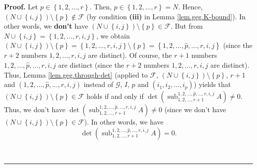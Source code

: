 \documentclass[numbers=enddot,12pt,final,onecolumn,notitlepage]{scrartcl}%
\theoremstyle{definition}
\newenvironment{proof}[1][Proof]{\noindent\textbf{#1.} }{\ \rule{0.5em}{0.5em}}
\theoremstyle{plainsl}
\begin{document}
\begin{proof}
Let $p\in\left\{  1,2,\ldots,r\right\}  $. Then, $p\in\left\{  1,2,\ldots
,r\right\}  =N$. Hence, $\left(  N\cup\left\{  i,j\right\}  \right)
\setminus\left\{  p\right\}  \notin\mathcal{F}$ (by condition \textbf{(iii)}
in Lemma \ref{lem.geg.K-bound}). In other words, we \textbf{don't} have
$\left(  N\cup\left\{  i,j\right\}  \right)  \setminus\left\{  p\right\}
\in\mathcal{F}$. But from $N\cup\left\{  i,j\right\}  =\left\{  1,2,\ldots
,r,i,j\right\}  $, we obtain $\left(  N\cup\left\{  i,j\right\}  \right)
\setminus\left\{  p\right\}  =\left\{  1,2,\ldots,r,i,j\right\}
\setminus\left\{  p\right\}  =\left\{  1,2,\ldots,\widehat{p},\ldots
,r,i,j\right\}  $ (since the $r+2$ numbers $1,2,\ldots,r,i,j$ are distinct).
Of course, the $r+1$ numbers $1,2,\ldots,\widehat{p},\ldots,r,i,j$ are
distinct (since the $r+2$ numbers $1,2,\ldots,r,i,j$ are distinct). Thus,
Lemma \ref{lem.geg.through-det} (applied to $\mathcal{F}$, $\left(
N\cup\left\{  i,j\right\}  \right)  \setminus\left\{  p\right\}  $, $r+1$ and
$\left(  1,2,\ldots,\widehat{p},\ldots,r,i,j\right)  $ instead of
$\mathcal{G}$, $I$, $p$ and $\left(  i_{1},i_{2},\ldots,i_{p}\right)  $)
yields that $\left(  N\cup\left\{  i,j\right\}  \right)  \setminus\left\{
p\right\}  \in\mathcal{F}$ holds if and only if $\det\left(
\operatorname*{sub}\nolimits_{1,2,\ldots,r+1}^{1,2,\ldots,\widehat{p}%
,\ldots,r,i,j}A\right)  \neq0.$ Thus, we don't have $\det\left(
\operatorname*{sub}\nolimits_{1,2,\ldots,r+1}^{1,2,\ldots,\widehat{p}%
,\ldots,r,i,j}A\right)  \neq0$ (since we don't have $\left(  N\cup\left\{
i,j\right\}  \right)  \setminus\left\{  p\right\}  \in\mathcal{F}$). In other
words, we have%
\begin{equation}
\det\left(  \operatorname*{sub}\nolimits_{1,2,\ldots,r+1}^{1,2,\ldots
,\widehat{p},\ldots,r,i,j}A\right)  =0. \label{pf.lem.geg.K-bound.c2.pf.2}%
\end{equation}



\end{proof}
\end{document}
